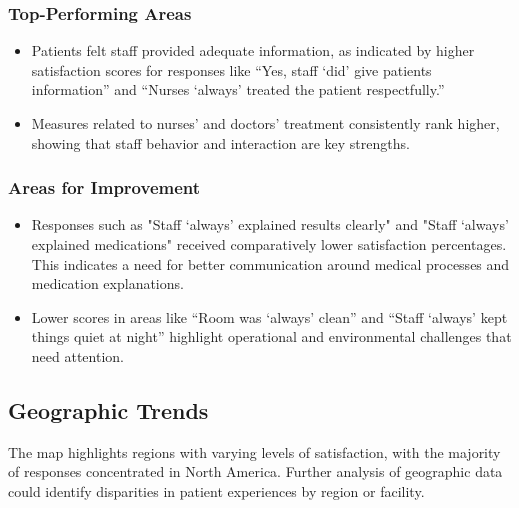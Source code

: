 \subsubsection{Top-Performing Areas}
\begin{itemize}
    \item Patients felt staff provided adequate information, as indicated by higher satisfaction scores for responses like “Yes, staff ‘did’ give patients information” and “Nurses ‘always’ treated the patient respectfully.”
    \item Measures related to nurses' and doctors' treatment consistently rank higher, showing that staff behavior and interaction are key strengths.
\end{itemize}

\subsubsection{Areas for Improvement}
\begin{itemize}
    \item Responses such as "Staff ‘always’ explained results clearly" and "Staff ‘always’ explained medications" received comparatively lower satisfaction percentages. This indicates a need for better communication around medical processes and medication explanations.
    \item Lower scores in areas like “Room was ‘always’ clean” and “Staff ‘always’ kept things quiet at night” highlight operational and environmental challenges that need attention.
\end{itemize}

\subsection{Geographic Trends}
The map highlights regions with varying levels of satisfaction, with the majority of responses concentrated in North America. Further analysis of geographic data could identify disparities in patient experiences by region or facility.

